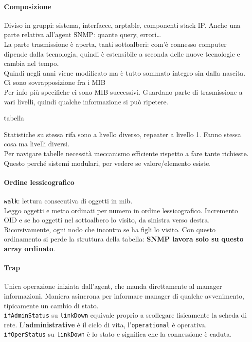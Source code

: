 \documentclass[10pt]{book}
\begin{document}
\paragraph{Composizione} Diviso in gruppi: sistema, interfacce, arptable, componenti stack IP. Anche una parte relativa all'agent SNMP: quante query, errori\ldots\\
La parte trasmissione è aperta, tanti sottoalberi: com'è connesso computer dipende dalla tecnologia, quindi è estensibile a seconda delle nuove tecnologie e cambia nel tempo.\\
Quindi negli anni viene modificato ma è tutto sommato integro sin dalla nascita. Ci sono sovrapposizione fra i MIB\\
Per info più specifiche ci sono MIB successivi. Guardano parte di trasmissione a vari livelli, quindi qualche informazione si può ripetere.
\begin{center}
	tabella
\end{center}
Statistiche su stessa rifa sono a livello diverso, repeater a livello 1. Fanno stessa cosa ma livelli diversi.\\
Per navigare tabelle necessità meccanismo efficiente rispetto a fare tante richieste. Questo perché sistemi modulari, per vedere se valore/elemento esiste.
\paragraph{Ordine lessicografico} \texttt{walk}: lettura consecutiva di oggetti in mib.\\
Leggo oggetti e metto ordinati per numero in ordine lessicografico. Incremento OID e se ho oggetti nel sottoalbero lo visito, da sinistra verso destra. Ricorsivamente, ogni nodo che incontro se ha figli lo visito. Con questo ordinamento si perde la struttura della tabella: \textbf{SNMP lavora solo su questo array ordinato}.
\paragraph{Trap} Unica operazione iniziata dall'agent, che manda direttamente al manager informazioni. Maniera asincrona per informare manager di qualche avvenimento, tipicamente un cambio di stato.\\
\texttt{ifAdminStatus} su \texttt{linkDown} equivale proprio a scollegare fisicamente la scheda di rete. L'\textbf{administrative} è il ciclo di vita, l'\texttt{operational} è operativa. \texttt{ifOperStatus} su \texttt{linkDown} è lo stato e significa che la connessione è caduta.
\end{document}
